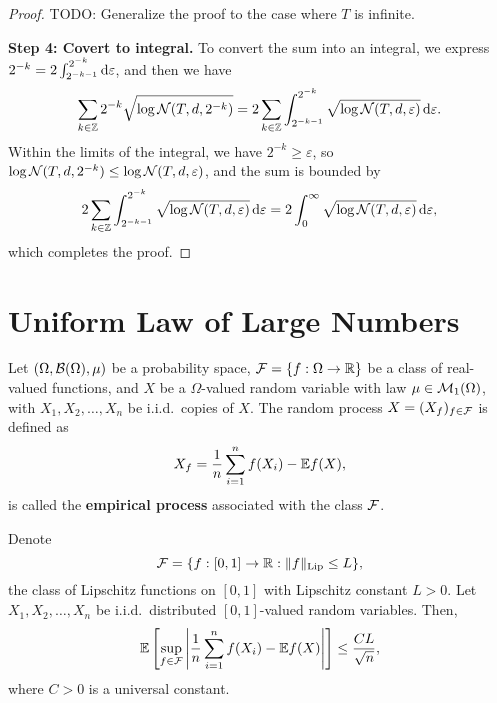 \begin{proof}
    TODO: Generalize the proof to the case where \(T\) is infinite.

    \textbf{Step 4: Covert to integral.} To convert the sum into an integral, we express \(2^{-k}=2\int_{2^{-k-1}}^{2^{-k}}\mathop{}\!\mathrm{d}\varepsilon\), and then we have
    \begin{equation*}
        \sum_{k\in{\mathbb Z}}2^{-k}\sqrt{\log{\mathcal N}(T,d,2^{-k})}=2\sum_{k\in{\mathbb Z}}\int_{2^{-k-1}}^{2^{-k}}\sqrt{\log{\mathcal N}(T,d,\varepsilon)}\mathop{}\!\mathrm{d}\varepsilon.
    \end{equation*}
    Within the limits of the integral, we have \(2^{-k}\geq\varepsilon\), so \(\log{\mathcal N}(T,d,2^{-k})\leq\log{\mathcal N}(T,d,\varepsilon)\), and the sum is bounded by
    \begin{equation*}
        2\sum_{k\in{\mathbb Z}}\int_{2^{-k-1}}^{2^{-k}}\sqrt{\log{\mathcal N}(T,d,\varepsilon)}\mathop{}\!\mathrm{d}\varepsilon=2\int_{0}^{\infty}\sqrt{\log{\mathcal N}(T,d,\varepsilon)}\mathop{}\!\mathrm{d}\varepsilon,
    \end{equation*}
    which completes the proof.
\end{proof}

\section{Uniform Law of Large Numbers}

\begin{definition}
    \label{def:empirical-process}
    Let \((\Omega,{\mathcal B}(\Omega),\mu)\) be a probability space, \({\mathcal F}=\{f:\Omega\to{\mathbb R}\}\) be a class of real-valued functions, and \(X\) be a \(\Omega\)-valued random variable with law \(\mu\in{\mathcal M}_{1}(\Omega)\), with \(X_{1},X_{2},\ldots,X_{n}\) be i.i.d.\ copies of \(X\). The random process \(X=(X_{f})_{f\in{\mathcal F}}\) is defined as
    \begin{equation*}
        X_{f}=\frac{1}{n}\sum_{i=1}^{n}f(X_{i})-{\mathbb E} f(X),
    \end{equation*}
    is called the \textbf{empirical process} associated with the class \({\mathcal F}\).
\end{definition}

\begin{theorem}
    Denote
    \begin{equation*}
        {\mathcal F}=\{f:[0,1]\to{\mathbb R}:\|f\|_{\text{Lip}}\leq L\},
    \end{equation*}
    the class of Lipschitz functions on \([0,1]\) with Lipschitz constant \(L>0\). Let \(X_{1},X_{2},\ldots,X_{n}\) be i.i.d.\ distributed \([0,1]\)-valued random variables. Then,
    \begin{equation*}
        {\mathbb E}\left[\sup_{f\in{\mathcal F}}\left|\frac{1}{n}\sum_{i=1}^{n}f(X_{i})-{\mathbb E} f(X)\right|\right]\leq\frac{CL}{\sqrt{n}},
    \end{equation*}
    where \(C>0\) is a universal constant.
\end{theorem}


